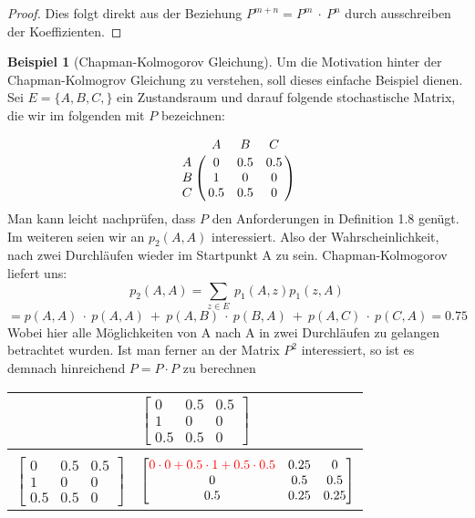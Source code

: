 \documentclass[a4paper,12pt]{scrartcl}
\theoremstyle{definition}
\newtheorem{bsp}{Beispiel}[section]
\let\bbordermatrix\bordermatrix
\begin{document}
\begin{proof}
Dies folgt direkt aus der Beziehung $P^{m+n} = P^{m} \: \cdot \: P^{n}$ durch ausschreiben der Koeffizienten. 
\end{proof}
\noindent
\begin{bsp}[Chapman-Kolmogorov Gleichung] Um die Motivation hinter der Chapman-Kolmogrov Gleichung zu verstehen, soll dieses einfache Beispiel dienen. Sei $ E = \lbrace A,B,C, \rbrace$ ein Zustandsraum und darauf folgende stochastische Matrix, die wir im folgenden mit $P$ bezeichnen:

\begin{equation*}
\bbordermatrix{
  & A   & B   & C  \cr
A & 0 & 0.5 & 0.5 \cr
B & 1 & 0 & 0 \cr
C & 0.5 & 0.5 & 0  \cr
}
\end{equation*}
\newline
\newline
Man kann leicht nachprüfen, dass $P$ den Anforderungen in Definition 1.8 genügt. Im weiteren seien wir an $p_{2}(A,A)$ interessiert. Also der Wahrscheinlichkeit, nach zwei Durchläufen wieder im Startpunkt A zu sein. Chapman-Kolmogorov liefert uns:  
\begin{equation*}
p_{2} (A,A) = \sum_{z \in E} \: p_{1}(A,z) p_{1}(z,A) 
\end{equation*}
\begin{equation*}
= p(A,A) \: \cdot \: p(A,A) \: + \: p(A,B) \: \cdot \: p(B,A) \: + \: p(A,C) \: \cdot \: p(C,A) = 0.75
\end{equation*}
Wobei hier alle Möglichkeiten von A nach A in zwei Durchläufen zu gelangen betrachtet wurden. Ist man ferner an der Matrix $P^{2}$ interessiert, so ist es demnach hinreichend $P = P \cdot P$ zu berechnen
\begin{table}[H]
  \centering
  \begin{tabular}{c|l}
       &  $ \begin{bmatrix} 0 & 0.5 & 0.5 \\ 1 & 0 & 0 \\ 0.5 & 0.5 & 0 \end{bmatrix} $ \\[7mm]
      \hline \\ [-3mm]
    $ \begin{bmatrix} 0 & 0.5 & 0.5 \\ 1 & 0 & 0 \\ 0.5 & 0.5 & 0 \end{bmatrix} $ &
    $ \begin{bmatrix} \textcolor{red} {0 \cdot 0 + 0.5 \cdot 1 + 0.5 \cdot 0.5 }& 0.25 & 0\\ 
                 0 & 0.5 & 0.5 \\ 
                  0.5 & 0.25 & 0.25    \end{bmatrix} $
  \end{tabular}
\end{table}
\end{bsp}
\end{document}
